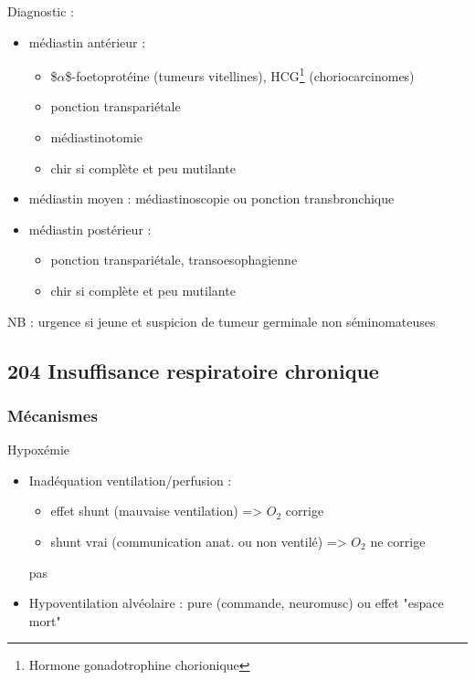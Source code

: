 \documentclass[11pt]{article}
\begin{document}
Diagnostic :

\begin{itemize}
\item médiastin antérieur : 

\begin{itemize}
\item \$\(\alpha\)\$-foetoprotéine (tumeurs vitellines), HCG\footnote{Hormone gonadotrophine chorionique} (choriocarcinomes)
\item ponction transpariétale
\item médiastinotomie
\item chir si complète et peu mutilante
\end{itemize}

\item médiastin moyen : médiastinoscopie ou ponction transbronchique
\item médiastin postérieur : 

\begin{itemize}
\item ponction transpariétale, transoesophagienne
\item chir si complète et peu mutilante
\end{itemize}
\end{itemize}



NB : urgence si jeune et suspicion de tumeur germinale non séminomateuses

\subsection{204 \textdagger{} Insuffisance respiratoire chronique}
\label{sec:orgcf5b431}
\label{sec:org6d633b6}
\subsubsection{Mécanismes}
\label{sec:orgb8d67d8}
\label{sec:org47f478d}
Hypoxémie

\begin{itemize}
\item Inadéquation ventilation/perfusion :

\begin{itemize}
\item effet shunt (mauvaise ventilation) => \(O_2\) corrige
\item shunt vrai (communication anat. ou non ventilé) => \(O_2\) ne corrige
\end{itemize}
pas

\item Hypoventilation alvéolaire : pure (commande, neuromusc) ou effet "espace mort"
\end{itemize}
\end{document}
